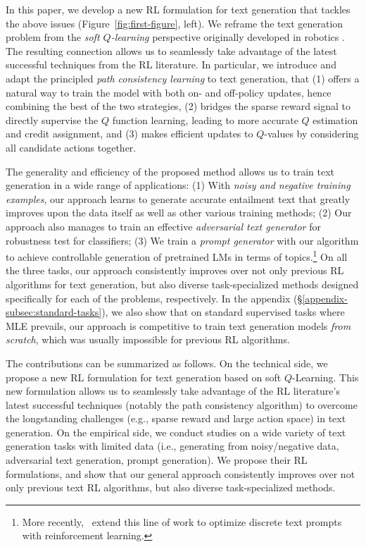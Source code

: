 In this paper, we develop a new RL formulation for text generation that tackles the above issues (Figure~\ref{fig:first-figure}, left). We reframe the text generation problem from the \emph{soft $Q$-learning} perspective originally developed in robotics \citep{haarnoja2017reinforcement,schulman2017equivalence}. The resulting connection allows us to seamlessly take advantage of the latest successful techniques from the RL literature. 
In particular, we introduce and adapt the principled \emph{path consistency learning} \citep{nachum2017bridging} to text generation, that (1) offers a natural way to train the model with both on- and off-policy updates, hence combining the best of the two strategies, (2) bridges the sparse reward signal to directly supervise the $Q$ function learning, leading to more accurate $Q$ estimation and credit assignment, and (3) makes efficient updates to $Q$-values by considering all candidate actions together. 

The generality and efficiency of the proposed method allows us to train text generation in a wide range of applications: (1) With \emph{noisy and negative training examples}, our approach learns to generate accurate entailment text that greatly improves upon the data itself as well as other various training methods; (2) Our approach also manages to train an effective \emph{adversarial text generator} for robustness test for classifiers; (3) We train a \emph{prompt generator} with our algorithm to achieve {controllable generation} of pretrained LMs in terms of topics.\footnote{More recently,~\citet{deng2022rlprompt} extend this line of work to optimize discrete text prompts with reinforcement learning.} On all the three tasks, our approach consistently improves over not only previous RL algorithms for text generation, but also diverse task-specialized methods designed specifically for each of the problems, respectively.
In the appendix (\S\ref{appendix-subsec:standard-tasks}), we also show that on standard supervised tasks where MLE prevails, our approach is competitive to train text generation models \emph{from scratch}, which was usually impossible for previous RL algorithms.







The contributions can be summarized as follows. On the technical side, we propose a new RL formulation for text generation based on soft $Q$-Learning. This new formulation allows us to seamlessly take advantage of the RL literature's latest successful techniques (notably the path consistency algorithm) to overcome the longstanding challenges (e.g., sparse reward and large action space) in text generation.
On the empirical side, we conduct studies on a wide variety of text generation tasks with limited data (i.e., generating from noisy/negative data, adversarial text generation, prompt generation). We propose their RL formulations, and show that our general approach consistently improves over not only previous text RL algorithms, but also diverse task-specialized methods.
